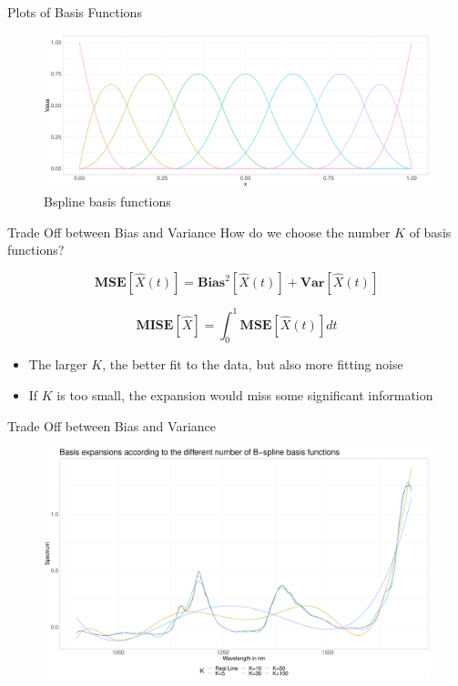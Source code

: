 \documentclass{beamer}
\begin{document}
	\begin{frame}{Plots of Basis Functions}
		\begin{figure}
			\includegraphics[height = 4.5cm]{../Graphics/Bspline_Basis.pdf}
			\caption {Bspline basis functions}
		\end{figure}
	\end{frame}
	
	\begin{frame}{Trade Off between Bias and Variance}
		How do we choose the number $K$ of basis functions?
		
		$$\textbf{MSE}[\hat{X}(t)] = \textbf{Bias}^2[\hat{X}(t)] + \textbf{Var}[\hat{X}(t)]$$
		
		$$\textbf{MISE}[\hat{X}] = \int_{0}^{1} \textbf{MSE}[\hat{X}(t)] dt$$
		
		\begin{itemize}
			\item The larger $K$, the better fit to the data, but also more fitting noise
			\item If $K$ is too small, the expansion would miss some significant information
		\end{itemize}
	\end{frame}
	
	\begin{frame}{Trade Off between Bias and Variance}
		\begin{figure}\notag
			\includegraphics[width = \textwidth]{../Graphics/basis_expansions.pdf}
		\end{figure}
	\end{frame}
\end{document}
